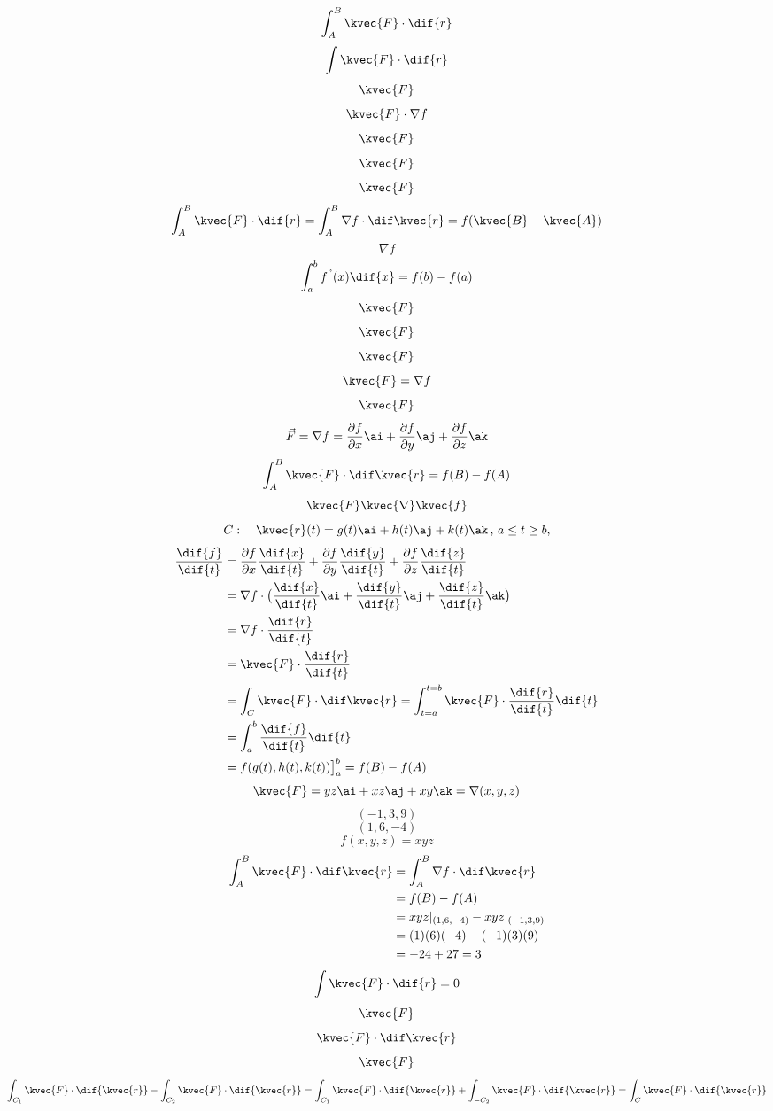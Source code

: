 \[\int_{A}^{B} \kvec{F} \cdot \dif {r}\]
\[\int \kvec{F} \cdot \dif {r}\]
\[\kvec{F}\]
\[\kvec{F} \cdot \nabla f\]
\[\kvec{F}\]
\[\kvec{F}\]
\[\kvec{F}\]
\[\int_{A}^{B} \kvec{F} \cdot \dif{r} = \int_{A}^{B} \nabla f \cdot \dif \kvec{r} = f(\kvec{B}- \kvec{A})\]
\[\nabla f\]
\[\int_{a}^{b} f^{"}(x) \dif{x}=f(b) - f(a)\]
\[\kvec{F}\]
\[\kvec{F}\]
\[\kvec{F}\]
\[\kvec{F} = \nabla f\]
\[\kvec{F}\]
\[\vec{F}=\nabla f = \frac{\partial f}{\partial x} \ai + \frac{\partial f}{\partial y} \aj + \frac{\partial f}{\partial z} \ak\]
\[\int_{A}^{B} \kvec{F} \cdot \dif \kvec{r} = f(B) - f(A)\]
\[\kvec{F} \kvec{\nabla} \kvec{f}\]
\[C:\quad \kvec{r}(t) = g(t)\ai + h(t)\aj + k(t)\ak\, , \,a\le t \ge b,\]
\begin{align*}
\frac{\dif{f}}{\dif{t}}&=\frac{\partial f}{\partial x} \frac{\dif{x}}{\dif{t}} + \frac{\partial f}{\partial y} \frac{\dif{y}}{\dif{t}} + \frac{\partial f}{\partial z} \frac{\dif{z}}{\dif{t}} \\
&=\nabla f \cdot \big(\frac{\dif{x}}{\dif{t}}\ai +\frac{\dif{y}}{\dif{t}}\aj +\frac{\dif{z}}{\dif{t}}\ak \big)\\
&=\nabla f \cdot \frac{\dif{r}}{\dif{t}} \\
&=\kvec{F} \cdot \frac{\dif{r}}{\dif{t}}\\
&=\int_{C} \kvec{F} \cdot \dif \kvec{r}= \int_{t=a}^{t=b} \kvec{F} \cdot \frac{\dif{r}}{\dif{t}} \dif{t}\\
&=\int_{a}^{b} \frac{\dif{f}}{\dif{t}} \dif{t} \\
&= f(g(t),h(t),k(t)) \big]_{a}^{b} =f(B)-f(A)
\end{align*}
\[\kvec{F} = yz\ai + xz \aj + xy \ak = \nabla (x,y,z)\]
\[(-1,3,9)\]
\[(1,6,-4)\]
\[f(x,y,z) = xyz\]
\begin{align*}
\int_{A}^{B} \kvec{F} \cdot \dif \kvec{r} &= \int_{A}^{B} \nabla f \cdot \dif \kvec{r}\\
&=f(B)- f(A)\\
&=xyz|_{(1,6,-4)} -xyz|_{(-1,3,9)}\\
&=(1)(6)(-4) - (-1)(3)(9)\\
&=-24+27=3
\end{align*}
\[\int\kvec{F} \cdot \dif{r}=0	\]
\[\kvec{F}\]
\[\kvec{F} \cdot \dif \kvec{r}\]
\[\kvec{F}\]
\begin{align*}
\int_{C_{1}} \kvec{F} \cdot \dif{\kvec{r}} -\int_{C_{2}}\kvec{F}\cdot \dif{\kvec{r}}= \int_{C_{1}}\kvec{F}\cdot\dif{\kvec{r}}+\int_{-C_{2}}\kvec{F}\cdot \dif{\kvec{r}}=\int_{C}\kvec{F}\cdot \dif{\kvec{r}}
\end{align*}
